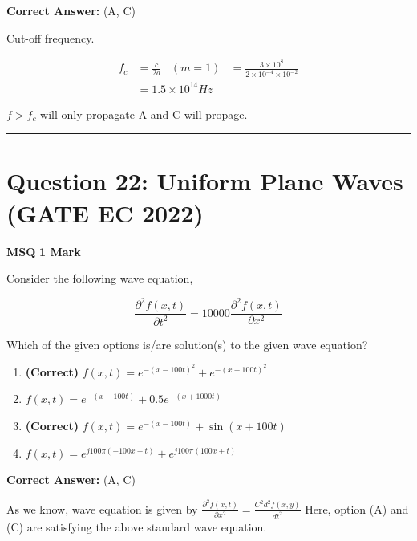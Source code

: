 \documentclass[11pt,a4paper]{article}
\begin{document}
\noindent \textbf{Correct Answer:} (A, C)

\begin{tcolorbox}[solbox, title=Detailed Solution -- Question 21]
Cut-off frequency.

\[
\begin{aligned}
f_c&=\frac{c}{2a}\;\;\;(m=1)
&=\frac{3 \times 10^8}{2 \times 10^{-4} \times 10^{-2}}\\
&=1.5 \times 10^{14}Hz
\end{aligned}
\]

$f > f_c$ will only propagate
 A and C will propage.
\end{tcolorbox}

\vspace{1.5em}
\hrule
\vspace{1.5em}

\section*{Question 22: Uniform Plane Waves (GATE EC 2022)}
\noindent \textbf{\color{primary}MSQ} \hfill \textbf{\color{secondary}1 Mark}


\noindent Consider the following wave equation,

\[
\frac{\partial^2 f(x,t)}{\partial t^2}=10000\frac{\partial^2 f(x,t)}{\partial x^2}
\]

Which of the given options is/are solution(s) to the given wave equation?


\begin{enumerate}[label=(\Alph*)]
    \item \textbf{(Correct)} $f(x,t)=e^{-(x-100t)^2}+e^{-(x+100t)^2}$
    \item $f(x,t)=e^{-(x-100t)}+0.5e^{-(x+1000t)}$
    \item \textbf{(Correct)} $f(x,t)=e^{-(x-100t)}+\sin (x+100t)$
    \item $f(x,t)=e^{j100 \pi(-100x+t)}+e^{j100 \pi(100x+t)}$
\end{enumerate}

\noindent \textbf{Correct Answer:} (A, C)

\begin{tcolorbox}[solbox, title=Detailed Solution -- Question 22]
As we know, wave equation is given by
$\frac{\partial^2 f(x,t)}{\partial x^2}=\frac{C^2d^2f(x,y)}{dt^2}$
Here, option (A) and (C) are satisfying the above
standard wave equation.
\end{tcolorbox}
\end{document}
